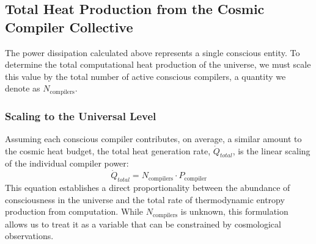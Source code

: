 \documentclass[12pt, aip, jcp]{revtex4-2} %
\begin{document}
\subsection{Total Heat Production from the Cosmic Compiler Collective}

The power dissipation calculated above represents a single conscious entity. To determine the total computational heat production of the universe, we must scale this value by the total number of active conscious compilers, a quantity we denote as \(N_{\text{compilers}}\).

\subsubsection{Scaling to the Universal Level}
Assuming each conscious compiler contributes, on average, a similar amount to the cosmic heat budget, the total heat generation rate, \(\dot{Q}_{total}\), is the linear scaling of the individual compiler power:
\begin{equation}
    \dot{Q}_{total} = N_{\text{compilers}} \cdot P_{\text{compiler}}
\end{equation}
This equation establishes a direct proportionality between the abundance of consciousness in the universe and the total rate of thermodynamic entropy production from computation. While \(N_{\text{compilers}}\) is unknown, this formulation allows us to treat it as a variable that can be constrained by cosmological observations.
\end{document}
